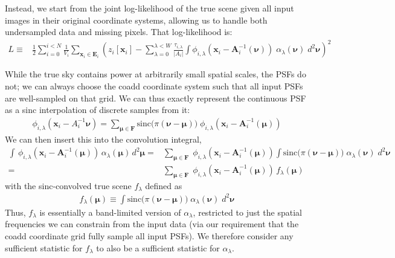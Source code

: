 \documentclass[DM,authoryear,toc]{lsstdoc}
\begin{document}
Instead, we start from the joint log-likelihood of the true scene given all input images in their original coordinate systems, allowing us to handle both undersampled data and missing pixels.
That log-likelihood is:
\begin{align}
L \equiv &
    \frac{1}{2} \sum_{i=0}^{i<N}
        \frac{1}{V_i}
        \sum_{\bm{x}_i \in \bm{E}_i}
        \left(
            z_i[\bm{x}_i]
            - \sum_{\lambda=0}^{\lambda < W}
                \frac{\tau_{i,\lambda}}{|A_i|}
                \int\!
                \phi_{i,\lambda}\!\left(
                    \bm{x}_i - \bm{A}_i^{-1}(\bm{\nu})
                \right)
                \; \alpha_{\lambda}(\bm{\nu})
                \; d^2\bm{\nu}
        \right)^2
\end{align}

While the true sky contains power at arbitrarily small spatial scales, the PSFs do not; we can always choose the coadd coordinate system such that all
input PSFs are well-sampled on that grid.
We can thus exactly represent the continuous PSF as a sinc interpolation of
discrete samples from it:
\begin{align}
    \phi_{i,\lambda}(\bm{x}_i-A_i^{-1}\bm{\nu}) =
    \sum_{\bm{\mu} \in \bm{F}}
        \mathrm{sinc}\big(\pi(\bm{\nu}-\bm{\mu})\big)
        \;\phi_{i,\lambda}\!\left(
            \bm{x}_i - \bm{A}_i^{-1}(\bm{\mu})
        \right)
\end{align}
We can then insert this into the convolution integral,
\begin{align}
    \int\!
        \, \phi_{i,\lambda}\!\left(\bm{x}_i-\bm{A}_i^{-1}(\bm{\mu})\right)
        \, \alpha_{\lambda}(\bm{\mu})
        \, d^2\bm{\mu}
    = &
    \sum_{\bm{\mu} \in \bm{F}}
        \;\phi_{i,\lambda}\!\left(
            \bm{x}_i - \bm{A}_i^{-1}(\bm{\mu})
        \right)
        \!\int\!
        \mathrm{sinc}\big(\pi(\bm{\nu}-\bm{\mu})\big)
        \; \alpha_{\lambda}(\bm{\nu})
        \; d^2\bm{\nu} \\
    = &
    \sum_{\bm{\mu} \in \bm{F}}
        \;\phi_{i,\lambda}\!\left(
            \bm{x}_i - \bm{A}_i^{-1}(\bm{\mu})
        \right)
        \, f_{\lambda}(\bm{\mu})
\end{align}
with the sinc-convolved true scene $f_{\lambda}$ defined as
\begin{align}
    f_{\lambda}(\bm{\mu}) \equiv \int\!
        \mathrm{sinc}\big(\pi(\bm{\nu}-\bm{\mu})\big)
        \; \alpha_{\lambda}(\bm{\nu})
        \; d^2\bm{\nu}
\end{align}
Thus, $f_{\lambda}$ is essentially a band-limited version of $\alpha_{\lambda}$, restricted to just the spatial frequencies we can constrain from the input data (via our requirement that the coadd coordinate grid fully sample all input PSFs).
We therefore consider any sufficient statistic for $f_{\lambda}$ to also be a sufficient statistic for $\alpha_{\lambda}$.
\end{document}
